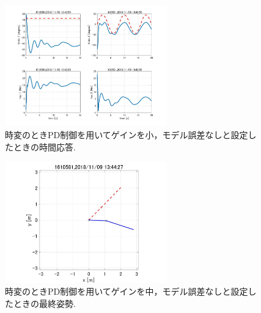 \documentclass[twocolumn, 10pt,a4j]{jsarticle}
\begin{document}
    \begin{figure}[H]
      \begin{center}
        \includegraphics[width=7cm]{../img/img/kansetu_PD_zihen_small_no_model_gosa_zikan_auto.jpg}
        \caption{時変のときPD制御を用いてゲインを小，モデル誤差なしと設定したときの時間応答.}
      \end{center}
    \end{figure}
    \begin{figure}[H]
      \begin{center}
        \includegraphics[width=7cm]{../img/img/kansetu_PD_zihen_chu_no_model_gosa_saisyu_sisei.jpg}
        \caption{時変のときPD制御を用いてゲインを中，モデル誤差なしと設定したときの最終姿勢.}
      \end{center}
    \end{figure}
\end{document}
